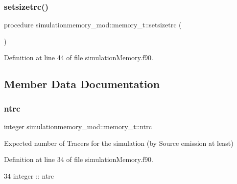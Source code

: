 \subsubsection{\texorpdfstring{setsizetrc()}{setsizetrc()}}
{\footnotesize\ttfamily procedure simulationmemory\+\_\+mod\+::memory\+\_\+t\+::setsizetrc (\begin{DoxyParamCaption}{ }\end{DoxyParamCaption})\hspace{0.3cm}{\ttfamily [private]}}



Definition at line 44 of file simulation\+Memory.\+f90.



\subsection{Member Data Documentation}
\mbox{\label{structsimulationmemory__mod_1_1memory__t_a4a8dedbf0302ce774a61b55a1053bd51}} 
\subsubsection{\texorpdfstring{ntrc}{ntrc}}
{\footnotesize\ttfamily integer simulationmemory\+\_\+mod\+::memory\+\_\+t\+::ntrc\hspace{0.3cm}{\ttfamily [private]}}



Expected number of Tracers for the simulation (by Source emission at least) 



Definition at line 34 of file simulation\+Memory.\+f90.


\begin{DoxyCode}
34         \textcolor{keywordtype}{integer} :: ntrc
\end{DoxyCode}
\mbox{\label{structsimulationmemory__mod_1_1memory__t_a12fbf3e8bb3b00b8ea7d69bd8c16c582}} 
